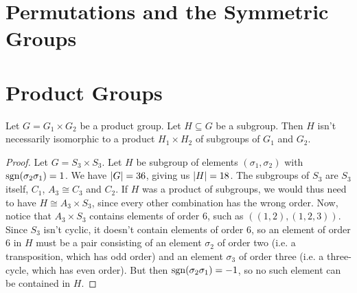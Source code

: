 \clearpage

\section{Permutations and the Symmetric Groups}

\clearpage

\section{Product Groups}
\begin{importanttheorem}{}{}
	Let $G = G_1 \times G_2$ be a product group. Let $H \subseteq G$ be a subgroup. Then $H$ isn't necessarily isomorphic to a product $H_1 \times H_2$ of subgroups of $G_1$ and $G_2$.
\end{importanttheorem}
\begin{proof}
	Let $G = S_3 \times S_3$. Let $H$ be subgroup of elements $(\sigma_1, \sigma_2)$ with $\operatorname{sgn}(\sigma_2 \sigma_1) = 1$. We have $\abs{G} = 36$, giving us $\abs{H} = 18$.
	\newpar
	The subgroups of $S_3$ are $S_3$ itself, $C_1$, $A_3 \cong C_3$ and $C_2$. If $H$ was a product of subgroups, we would thus need to have $H \cong A_3 \times S_3$, since every other combination has the wrong order.
	\newpar
	Now, notice that $A_3 \times S_3$ contains elements of order $6$, such as $((1,2),(1,2,3))$. Since $S_3$ isn't cyclic, it doesn't contain elements of order $6$, so an element of order $6$ in $H$ must be a pair consisting of an element $\sigma_2$ of order two (i.e. a transposition, which has odd order) and an element $\sigma_3$ of order three (i.e. a three-cycle, which has even order). But then $\operatorname{sgn}(\sigma_2\sigma_1) = -1$, so no such element can be contained in $H$.
\end{proof}
\clearpage

